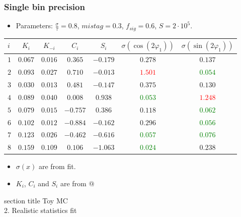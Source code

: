 \documentclass[10 pt,compress,mathserif]{beamer}
\begin{document}
\begin{frame}[containsverbatim]
 \frametitle{Single bin precision}
 
 \begin{itemize}
  \item Parameters: $\frac{\sigma}{\tau}=0.8$, $mistag = 0.3$, $f_{sig} = 0.6$, $S = 2\cdot10^5$.
 \end{itemize}
 
 \begin{table}[bt]
 \small
\begin{tabular}{|l|c|c|c|c|c|c|} \hline
$i$ & $K_{i}$ & $K_{-i}$ & $C_i$ & $S_i$ & $\sigma\left({\cos(2\varphi_1)}\right)$ & $\sigma\left({\sin(2\varphi_1)}\right)$ \\ \hline
$1$ & $0.067$ & $0.016$ & $0.365$ & $-0.179$ & $0.278$ & $0.137$ \\ \hline
$2$ & $0.093$ & $0.027$ & $0.710$ & $-0.013$ & \textcolor{red}{$1.501$} & \textcolor{green}{$0.054$} \\ \hline
$3$ & $0.030$ & $0.013$ & $0.481$ & $-0.147$ & $0.375$ & $0.130$ \\ \hline
$4$ & $0.089$ & $0.040$ & $0.008$ & $0.938$ & \textcolor{green}{$0.053$} & \textcolor{red}{$1.248$} \\ \hline
$5$ & $0.079$ & $0.015$ & $-0.757$ & $0.386$ & $0.118$ & \textcolor{green}{$0.062$} \\ \hline
$6$ & $0.102$ & $0.012$ & $-0.884$ & $-0.162$ & $0.296$ & \textcolor{green}{$0.056$} \\ \hline
$7$ & $0.123$ & $0.026$ & $-0.462$ & $-0.616$ & \textcolor{green}{$0.057$} & \textcolor{green}{$0.076$} \\ \hline
$8$ & $0.159$ & $0.109$ & $0.106$ & $-1.063$ & \textcolor{green}{$0.024$} & $0.238$ \\ \hline
\end{tabular}
\end{table}

 \begin{itemize}
  \item $\sigma(x)$ are from fit.
  \item $K_i$, $C_i$ and $S_i$ are from @
 \end{itemize}
\end{frame}

\begin{frame}
 \centering
    \begin{beamercolorbox}[sep=8pt,center]{section title}
       Toy MC\\ 2. Realistic statistics fit
    \end{beamercolorbox}
\end{frame}
\end{document}
